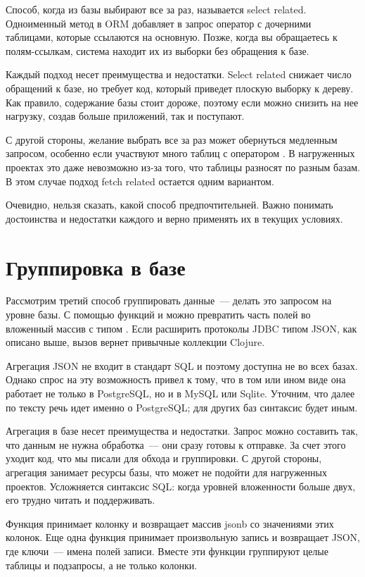 Способ, когда из базы выбирают все за раз, называется select related. Одноименный метод в ORM добавляет в запрос оператор  с дочерними таблицами, которые ссылаются на основную. Позже, когда вы обращаетесь к полям-ссылкам, система находит их из выборки без обращения к базе.

Каждый подход несет преимущества и недостатки. Select related снижает число обращений к базе, но требует код, который приведет плоскую выборку к дереву. Как правило, содержание базы стоит дороже, поэтому если можно снизить на нее нагрузку, создав больше приложений, так и поступают.

С другой стороны, желание выбрать все за раз может обернуться медленным запросом, особенно если участвуют много таблиц с оператором . В нагруженных проектах это даже невозможно из-за того, что таблицы разносят по разным базам. В этом случае подход fetch related остается одним вариантом.

Очевидно, нельзя сказать, какой способ предпочтительней. Важно понимать достоинства и недостатки каждого и верно применять их в текущих условиях.

\section{Группировка в базе}

Рассмотрим третий способ группировать данные~--- делать это запросом на уровне базы. С помощью функций  и  можно превратить часть полей во вложенный массив с типом . Если расширить протоколы JDBC типом JSON, как описано выше, вызов  вернет привычные коллекции Clojure.

Агрегация JSON не входит в стандарт SQL и поэтому доступна не во всех базах. Однако спрос на эту возможность привел к тому, что в том или ином виде она работает не только в PostgreSQL, но и в MySQL или Sqlite. Уточним, что далее по тексту речь идет именно о PostgreSQL; для других баз синтаксис будет иным.

Агрегация в базе несет преимущества и недостатки. Запрос можно составить так, что данным не нужна обработка~--- они сразу готовы к отправке. За счет этого уходит код, что мы писали для обхода и группировки. С другой стороны, агрегация занимает ресурсы базы, что может не подойти для нагруженных проектов. Усложняется синтаксис SQL: когда уровней вложенности больше двух, его трудно читать и поддерживать.

Функция  принимает колонку и возвращает массив jsonb со значениями этих колонок. Еще одна функция  принимает произвольную запись и возвращает JSON, где ключи~--- имена полей записи. Вместе эти функции группируют целые таблицы и подзапросы, а не только колонки.

